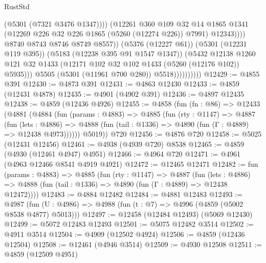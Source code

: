\begin{lexlean}{RustStd}
\begin{coremodule}
                                        (@5301 (@7321 @3476 @1347))))
                                    (@12261
                                      @360
                                      @109
                                      @32
                                      @14
                                      @1865
                                      @1341
                                      (@12269 @226 @32 @226 @1865 (@5260 (@12274 @226)) @7991)
                                      @12343))))
                              @8740
                              @8743
                              @8746
                              @8749
                              @8557))
                          (@5376 (@12227 @61))
                          (@5301 (@12231 @119 @395))
                          (@5183 (@12238 @395 @91 @1547 @1347))
                          (@5432
                            @12138
                            @1260
                            @121
                            @32
                            @1433
                            (@12171 @102 @32 @102 @1433 (@5260 (@12176 @102)) @5935)))
                        @5505
                        (@5301 (@11961 @700 @280))
                        @5518))))))))))
@12429 := @4855 @391
@12430 := @4873 @391
@12431 := @4863 @12430
@12433 := @4859 (@12431 @4878)
@12435 := @4901 (@4902 @391)
@12436 := @4897 @12435
@12438 := @4859 (@12436 @4926)
@12455 := @4858
    (fun (fn : @86) =>
    @12433
      (@4881
        (@4884
          (fun (params : @4883) =>
          @4885
            (fun (rty : @1147) =>
            @4887
              (fun (lets : @4886) =>
              @4888 (fun (tail : @1336) => @4890 (fun (Γ : @4889) => @12438 @4973))))))
        @5019))
    @720
@12456 := @4876 @720
@12458 := @5025 (@12431 @12456)
@12461 := @4938 (@4939 @720) @8538
@12465 := @4859 (@4930 (@12461 @4947) @4951)
@12466 := @4964 @720
@12471 := @4961 (@4963 @12466 @8541 @4919 @4921)
@12472 := @12465 @12471
@12482 := fun (params : @4883) =>
  @4885
    (fun (rty : @1147) =>
    @4887
      (fun (lets : @4886) =>
      @4888 (fun (tail : @1336) => @4890 (fun (Γ : @4889) => @12438 @12472))))
@12483 := @4884 @12482
@12484 := @4881 @12483
@12493 := @4987 (fun (U : @4986) => @4988 (fun (t : @7) => @4996 (@4859 (@5002 @8538 @4877) @5013)))
@12497 := @12458 (@12484 @12493) (@5069 @12430)
@12499 := @5072 @12483 @12493
@12501 := @5075 @12482 @3514
@12502 := @4911 @3514
@12504 := @4909 (@12502 @4924)
@12506 := @4859 (@12436 @12504)
@12508 := @12461 (@4946 @3514)
@12509 := @4930 @12508
@12511 := @4859 (@12509 @4951)

\end{coremodule}
\end{lexlean}

